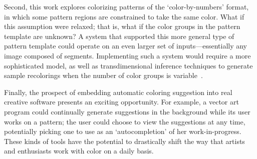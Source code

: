 Second, this work explores colorizing patterns of the `color-by-numbers' format, in which some pattern regions are constrained to take the same color. What if this assumption were relaxed; that is, what if the color groups in the pattern template are unknown? A system that supported this more general type of pattern template could operate on an even larger set of inputs---essentially any image composed of segments. Implementing such a system would require a more sophisticated model, as well as transdimensional inference techniques to generate sample recolorings when the number of color groups is variable~\cite{ReversibleJumpMCMC}.

Finally, the prospect of embedding automatic coloring suggestion into real creative software presents an exciting opportunity. For example, a vector art program could continually generate suggestions in the background while its user works on a pattern; the user could choose to view the suggestions at any time, potentially picking one to use as an `autocompletion' of her work-in-progress. These kinds of tools have the potential to drastically shift the way that artists and enthusiasts work with color on a daily basis. 